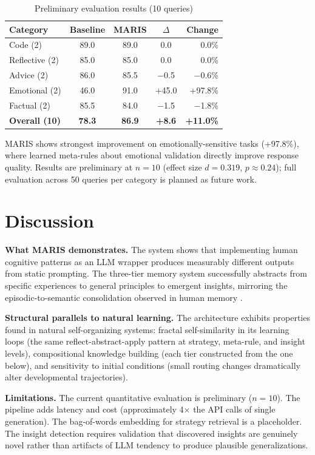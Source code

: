 \documentclass[11pt,a4paper]{article}
\begin{document}
\begin{table}[H]
\centering
\caption{Preliminary evaluation results (10 queries)}
\begin{tabular}{lcccr}
\toprule
\textbf{Category} & \textbf{Baseline} & \textbf{MARIS} & \textbf{$\Delta$} & \textbf{Change} \\
\midrule
Code (2) & 89.0 & 89.0 & 0.0 & 0.0\% \\
Reflective (2) & 85.0 & 85.0 & 0.0 & 0.0\% \\
Advice (2) & 86.0 & 85.5 & $-$0.5 & $-$0.6\% \\
Emotional (2) & 46.0 & 91.0 & +45.0 & +97.8\% \\
Factual (2) & 85.5 & 84.0 & $-$1.5 & $-$1.8\% \\
\midrule
\textbf{Overall (10)} & \textbf{78.3} & \textbf{86.9} & \textbf{+8.6} & \textbf{+11.0\%} \\
\bottomrule
\end{tabular}
\end{table}

MARIS shows strongest improvement on emotionally-sensitive tasks (+97.8\%), where learned meta-rules about emotional validation directly improve response quality. Results are preliminary at $n=10$ (effect size $d=0.319$, $p\approx0.24$); full evaluation across 50 queries per category is planned as future work.

\section{Discussion}

\textbf{What MARIS demonstrates.} The system shows that implementing human cognitive patterns as an LLM wrapper produces measurably different outputs from static prompting. The three-tier memory system successfully abstracts from specific experiences to general principles to emergent insights, mirroring the episodic-to-semantic consolidation observed in human memory \cite{memorysystems2000}.

\textbf{Structural parallels to natural learning.} The architecture exhibits properties found in natural self-organizing systems: fractal self-similarity in its learning loops (the same reflect-abstract-apply pattern at strategy, meta-rule, and insight levels), compositional knowledge building (each tier constructed from the one below), and sensitivity to initial conditions (small routing changes dramatically alter developmental trajectories).

\textbf{Limitations.} The current quantitative evaluation is preliminary ($n=10$). The pipeline adds latency and cost (approximately 4$\times$ the API calls of single generation). The bag-of-words embedding for strategy retrieval is a placeholder. The insight detection requires validation that discovered insights are genuinely novel rather than artifacts of LLM tendency to produce plausible generalizations.
\end{document}
